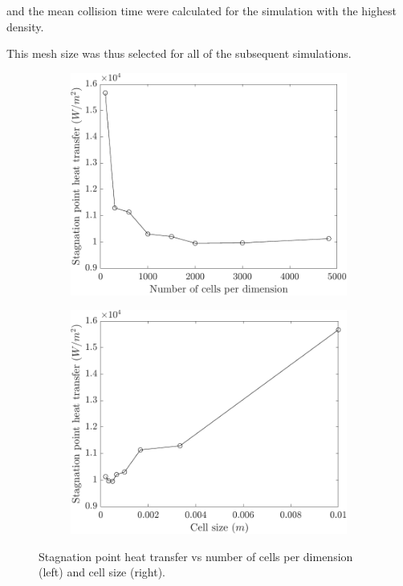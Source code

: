 and the mean collision time were calculated for the simulation with the highest density. 


This mesh size was thus selected for all of the subsequent simulations. 


\begin{figure}
    \centering
    \begin{subfigure}{0.49\textwidth}
        \centering
        \includegraphics[width=\textwidth]{Images/3. Methodology/Mesh convergence/sphnc.pdf}
    \end{subfigure}
    \hfill
    \begin{subfigure}{0.49\textwidth}
        \centering
        \includegraphics[width=\textwidth]{Images/3. Methodology/Mesh convergence/sphcs.pdf}
    \end{subfigure}
    \caption{Stagnation point heat transfer vs number of cells per dimension (left) and cell size (right).}
    \label{fig:meshstag}
\end{figure}

